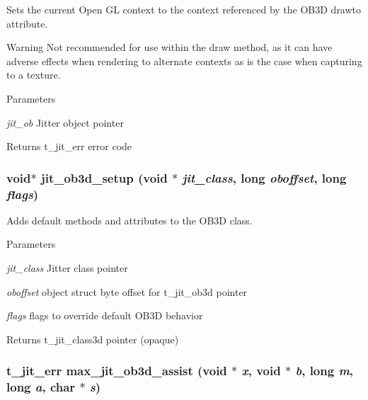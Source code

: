 Sets the current Open GL context to the context referenced by the OB3D drawto attribute. \begin{DoxyWarning}{Warning}
Not recommended for use within the draw method, as it can have adverse effects when rendering to alternate contexts as is the case when capturing to a texture.
\end{DoxyWarning}

\begin{DoxyParams}{Parameters}
\item[{\em jit\_\-ob}]Jitter object pointer\end{DoxyParams}
\begin{DoxyReturn}{Returns}
t\_\-jit\_\-err error code 
\end{DoxyReturn}
\hypertarget{group__ob3dmod_gaee60152a1d507a630e14f0e4f71e86f2}{
\subsubsection[{jit\_\-ob3d\_\-setup}]{\setlength{\rightskip}{0pt plus 5cm}void$\ast$ jit\_\-ob3d\_\-setup (void $\ast$ {\em jit\_\-class}, \/  long {\em oboffset}, \/  long {\em flags})}}
\label{group__ob3dmod_gaee60152a1d507a630e14f0e4f71e86f2}


Adds default methods and attributes to the OB3D class. 
\begin{DoxyParams}{Parameters}
\item[{\em jit\_\-class}]Jitter class pointer \item[{\em oboffset}]object struct byte offset for t\_\-jit\_\-ob3d pointer \item[{\em flags}]flags to override default OB3D behavior\end{DoxyParams}
\begin{DoxyReturn}{Returns}
t\_\-jit\_\-class3d pointer (opaque) 
\end{DoxyReturn}
\hypertarget{group__ob3dmod_ga8fa7e82f9a1f64c2e5d10b2dbf340536}{
\subsubsection[{max\_\-jit\_\-ob3d\_\-assist}]{\setlength{\rightskip}{0pt plus 5cm}t\_\-jit\_\-err max\_\-jit\_\-ob3d\_\-assist (void $\ast$ {\em x}, \/  void $\ast$ {\em b}, \/  long {\em m}, \/  long {\em a}, \/  char $\ast$ {\em s})}}
\label{group__ob3dmod_ga8fa7e82f9a1f64c2e5d10b2dbf340536}


